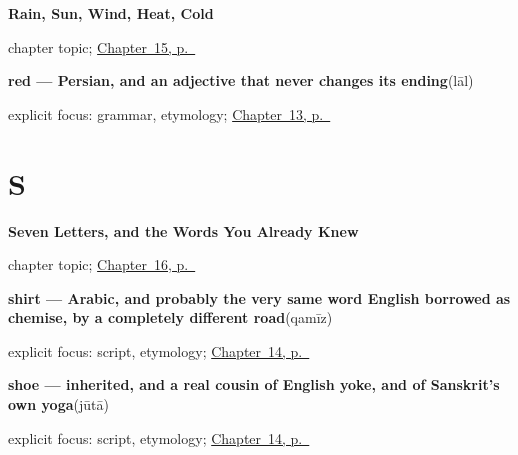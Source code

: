 \noindent\begin{minipage}[t]{\linewidth}
\raggedright
\textbf{Rain, Sun, Wind, Heat, Cold}\par
\footnotesize chapter topic; \hyperref[ch:ur-weather]{Chapter~15, p.~\pageref*{ch:ur-weather}}
\end{minipage}\par\smallskip

\noindent\begin{minipage}[t]{\linewidth}
\raggedright
\textbf{red — Persian, and an adjective that never changes its ending}\enspace\emph{}\enspace(lāl)\par
\footnotesize explicit focus: grammar, etymology; \hyperref[ch:ur-colors]{Chapter~13, p.~\pageref*{ch:ur-colors}}
\end{minipage}\par\smallskip

\section*{S}

\noindent\begin{minipage}[t]{\linewidth}
\raggedright
\textbf{Seven Letters, and the Words You Already Knew}\par
\footnotesize chapter topic; \hyperref[ch:ur-script-seven]{Chapter~16, p.~\pageref*{ch:ur-script-seven}}
\end{minipage}\par\smallskip

\noindent\begin{minipage}[t]{\linewidth}
\raggedright
\textbf{shirt — Arabic, and probably the very same word English borrowed as chemise, by a completely different road}\enspace\emph{}\enspace(qamīz)\par
\footnotesize explicit focus: script, etymology; \hyperref[ch:ur-clothing]{Chapter~14, p.~\pageref*{ch:ur-clothing}}
\end{minipage}\par\smallskip

\noindent\begin{minipage}[t]{\linewidth}
\raggedright
\textbf{shoe — inherited, and a real cousin of English yoke, and of Sanskrit's own yoga}\enspace\emph{}\enspace(jūtā)\par
\footnotesize explicit focus: script, etymology; \hyperref[ch:ur-clothing]{Chapter~14, p.~\pageref*{ch:ur-clothing}}
\end{minipage}\par\smallskip

